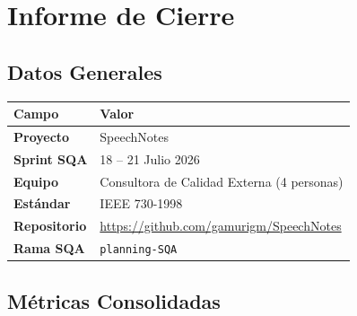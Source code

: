 \chapter{Informe de Cierre}
\label{apendice:e}

\section{Datos Generales}

\begin{longtable}{lp{10cm}}
\toprule
\textbf{Campo} & \textbf{Valor}\\
\midrule
\endhead
\bottomrule
\endfoot

\textbf{Proyecto} & SpeechNotes\\
\textbf{Sprint SQA} & 18 -- 21 Julio 2026\\
\textbf{Equipo} & Consultora de Calidad Externa (4 personas)\\
\textbf{Estándar} & IEEE 730-1998\\
\textbf{Repositorio} & \url{https://github.com/gamurigm/SpeechNotes}\\
\textbf{Rama SQA} & \texttt{planning-SQA}\\

\bottomrule
\end{longtable}

\section{Métricas Consolidadas}

